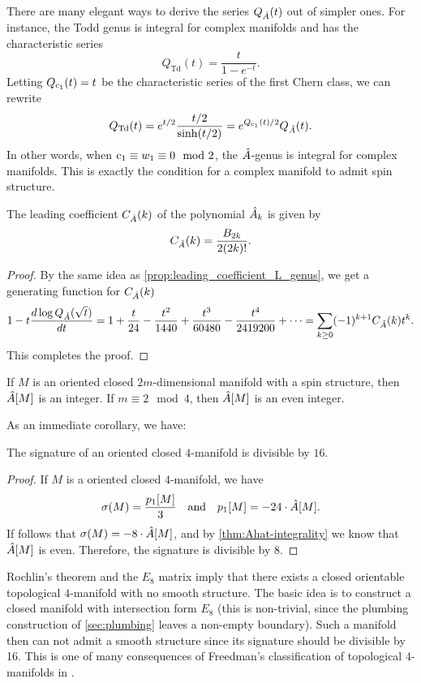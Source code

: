 \begin{remark*}
	There are many elegant ways to derive the series $Q_{{\hat{A}}}(t)$ out of simpler ones. For instance, the Todd genus is integral for complex manifolds and has the characteristic series 
\[
	Q_{\mathrm{Td}}(t) = \frac{t}{1-e^{-t}}.
\]
Letting $Q_{\mathrm{c}_1}(t)=t$ be the characteristic series of the first Chern class, we can rewrite
\[
	Q_{\mathrm{Td}}(t) = e^{t/2} \frac{t/2}{\sinh(t/2)} = e^{Q_{\mathrm{c}_1}(t)/2}Q_{{\hat{A}}}(t).
\]
In other words, when $\mathrm{c}_1\equiv w_1\equiv 0\mod 2$, the ${\hat{A}}$-genus is integral for complex manifolds. This is exactly the condition for a complex manifold to admit spin structure.
\end{remark*}

\begin{proposition}\label{prop:leading_coefficient_Ahat_genus}
	The leading coefficient $C_{\hat{A}}(k)$ of the polynomial ${\hat{A}}_k$ is given by
	\[
		C_{\hat{A}}(k)=\frac{B_{2k}}{2(2k)!}.
	\]
\end{proposition}
\begin{proof}
	By the same idea as \cref{prop:leading_coefficient_L_genus}, we get a generating function for $C_{\hat{A}}(k)$
	\[
		1-t\frac{d\log Q_{{\hat{A}}}(\sqrt{t})}{dt} = 1+\frac{t}{24}-\frac{t^2}{1440}+\frac{t^3}{60480} - \frac{t^4}{2419200}+\cdots = \sum_{k\geq 0} (-1)^{k+1}C_{\hat{A}}(k) t^k.
	\]
	This completes the proof.
\end{proof}

\begin{theorem}\label{thm:Ahat-integrality}
	If $M$ is an oriented closed $2m$-dimensional manifold with a spin structure, then ${\hat{A}}[M]$ is an integer. If $m\equiv 2\mod 4$, then ${\hat{A}}[M]$ is an even integer.
\end{theorem}

As an immediate corollary, we have:

\begin{theorem}[Rochlin]\label{thm:rochlin}
	The signature of an oriented closed $4$-manifold is divisible by $16$.
\end{theorem}
\begin{proof}
	If $M$ is a oriented closed $4$-manifold, we have
	\[
		\sigma(M) = \frac{p_1[M]}{3}\quad\textrm{and}\quad p_1[M] = -24\cdot{\hat{A}}[M].
	\]
	If follows that $\sigma(M)=-8\cdot{\hat{A}}[M]$, and by \cref{thm:Ahat-integrality} we know that ${\hat{A}}[M]$ is even. Therefore, the signature is divisible by $8$.
\end{proof}

\begin{remark*}\label{rmk:E8-manifold}
	Rochlin's theorem and the $E_8$ matrix imply that there exists a closed orientable topological $4$-manifold with no smooth structure. The basic idea is to construct a closed manifold with intersection form $E_8$ (this is non-trivial, since the plumbing construction of \cref{sec:plumbing} leaves a non-empty boundary). 
	Such a manifold then can not admit a smooth structure since its signature should be divisible by 16. This is one of many consequences of Freedman's classification of topological $4$-manifolds in \cite{freedman1982manifold}.
\end{remark*}

